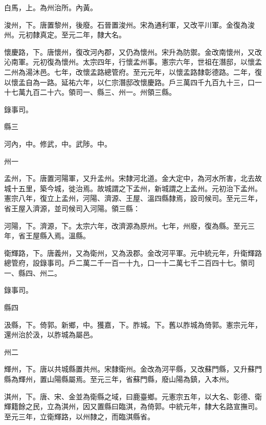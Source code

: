 \begin{pinyinscope}
 白馬，上。為州治所。內黃。



 浚州，下。唐置黎州，後廢。石晉置浚州。宋為通利軍，又改平川軍。金復為浚州。元初隸真定。至元二年，隸大名。



 懷慶路，下。唐懷州，復改河內郡，又仍為懷州。宋升為防禦。金改南懷州，又改沁南軍。元初復為懷州。太宗四年，行懷孟州事。憲宗六年，世祖在潛邸，以懷孟二州為湯沐邑。七年，改懷孟路總管府。至元元年，以懷孟路隸彰德路。二年，復以懷孟自為一路。延祐六年，以仁宗潛邸改懷慶路。戶三萬四千九百九十三，口一十七萬九百二十六。領司一、縣三、州一。州領三縣。



 錄事司。



 縣三



 河內，中。修武，中。武陟。中。



 州一



 孟州，下。唐置河陽軍，又升孟州。宋隸河北道。金大定中，為河水所害，北去故城十五里，築今城，徙治焉。故城謂之下孟州，新城謂之上孟州。元初治下孟州。憲宗八年，復立上孟州，河陽、濟源、王屋、溫四縣隸焉，設司候司。至元三年，省王屋入濟源，並司候司入河陽。領三縣：



 河陽，下。濟源，下。太宗六年，改濟源為原州。七年，州廢，復為縣。至元三年，省王屋縣入焉。溫縣。



 衛輝路，下。唐義州，又為衛州，又為汲郡。金改河平軍。元中統元年，升衛輝路總管府，設錄事司。戶二萬二千一百一十九，口一十二萬七千二百四十七。領司一、縣四、州二。



 錄事司。



 縣四



 汲縣，下。倚郭。新鄉，中。獲嘉，下。胙城。下。舊以胙城為倚郭。憲宗元年，還州治於汲，以胙城為屬邑。



 州二



 輝州，下。唐以共城縣置共州。宋隸衛州。金改為河平縣，又改蘇門縣，又升蘇門縣為輝州，置山陽縣屬焉。至元三年，省蘇門縣，廢山陽為鎮，入本州。



 淇州，下。唐、宋、金並為衛縣之域，曰鹿臺鄉。元憲宗五年，以大名、彰德、衛輝籍餘之民，立為淇州，因又置縣曰臨淇，為倚郭。中統元年，隸大名路宣撫司。至元三年，立衛輝路，以州隸之，而臨淇縣省。




\end{pinyinscope}
